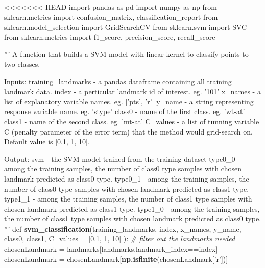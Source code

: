 \documentclass[10pt,letterpaper]{article}
\newenvironment{Shaded}{\begin{snugshade}}{\end{snugshade}}
\newcommand{\KeywordTok}[1]{\textcolor[rgb]{0.13,0.29,0.53}{\textbf{#1}}}
\newcommand{\DataTypeTok}[1]{\textcolor[rgb]{0.13,0.29,0.53}{#1}}
\newcommand{\DecValTok}[1]{\textcolor[rgb]{0.00,0.00,0.81}{#1}}
\newcommand{\FloatTok}[1]{\textcolor[rgb]{0.00,0.00,0.81}{#1}}
\newcommand{\StringTok}[1]{\textcolor[rgb]{0.31,0.60,0.02}{#1}}
\newcommand{\CommentTok}[1]{\textcolor[rgb]{0.56,0.35,0.01}{\textit{#1}}}
\newcommand{\NormalTok}[1]{#1}
\begin{document}
\begin{Shaded}
\begin{Highlighting}[]
<<<<<<< HEAD
\NormalTok{import pandas as pd}
\NormalTok{import numpy as np}
\NormalTok{from sklearn.metrics import confusion_matrix, classification_report}
\NormalTok{from sklearn.model_selection import GridSearchCV}
\NormalTok{from sklearn.svm import SVC}
\NormalTok{from sklearn.metrics import f1_score, precision_score, recall_score}

\StringTok{'''}
\StringTok{A function that builds a SVM model with linear kernel to classify points}
\StringTok{to two classes.}

\StringTok{Inputs:}
\StringTok{training_landmarks - a pandas dataframe containing all training landmark}
\StringTok{                     data.}
\StringTok{index              - a perticular landmark id of interest. eg. '}\DecValTok{101}\StringTok{'}
\StringTok{x_names            - a list of explanatory variable names.}
\StringTok{                     eg. ['}\NormalTok{pts}\StringTok{', '}\NormalTok{r}\StringTok{']}
\StringTok{y_name             - a string representing response variable name.}
\StringTok{                     eg. '}\NormalTok{stype}\StringTok{'}
\StringTok{class0             - name of the first class. eg. '}\NormalTok{wt-at}\StringTok{'}
\StringTok{class1             - name of the second class. eg. '}\NormalTok{mt-at}\StringTok{'}
\StringTok{C_values           - a list of tunning variable C (penalty parameter}
\StringTok{                     of the error term) that the method would grid-search}
\StringTok{                     on. Default value is [0.1, 1, 10].}

\StringTok{Output:}
\StringTok{svm                - the SVM model trained from the training dataset}
\StringTok{type0_0            - among the training samples, the number of class0 type}
\StringTok{                     samples with chosen landmark predicted as class0 type.}
\StringTok{type0_1            - among the training samples, the number of class0 type}
\StringTok{                     samples with chosen landmark predicted as class1 type.}
\StringTok{type1_1            - among the training samples, the number of class1 type}
\StringTok{                     samples with chosen landmark predicted as class1 type.}
\StringTok{type1_0            - among the training samples, the number of class1 type}
\StringTok{                     samples with chosen landmark predicted as class0 type.}
\StringTok{'''}
\NormalTok{def }\KeywordTok{svm_classification}\NormalTok{(training_landmarks, index, x_names, y_name, class0,}
        \NormalTok{class1, }\DataTypeTok{C_values =} \NormalTok{[}\FloatTok{0.1}\NormalTok{, }\DecValTok{1}\NormalTok{, }\DecValTok{10}\NormalTok{] ):}
\StringTok{    }\CommentTok{# filter out the landmarks needed}
\StringTok{    }\NormalTok{chosenLandmark =}\StringTok{ }\NormalTok{landmarks[landmarks.landmark_index==index]}
    \NormalTok{chosenLandmark =}\StringTok{ }\NormalTok{chosenLandmark[}\KeywordTok{np.isfinite}\NormalTok{(chosenLandmark[}\StringTok{'r'}\NormalTok{])]}
    

\end{Highlighting}
\end{Shaded}
\end{document}
